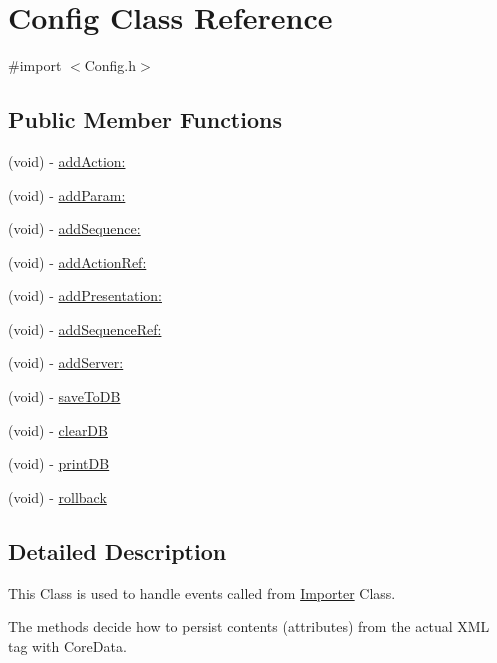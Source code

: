 \hypertarget{interface_config}{
\section{Config Class Reference}
\label{interface_config}
}


{\ttfamily \#import $<$Config.h$>$}

\subsection*{Public Member Functions}
\begin{DoxyCompactItemize}
\item 
(void) -\/ \hyperlink{interface_config_ad736974b0fa1ff6118003a824e2561b2}{addAction:}
\item 
(void) -\/ \hyperlink{interface_config_a47a88ff3de3b7101817eff6b8069ce4c}{addParam:}
\item 
(void) -\/ \hyperlink{interface_config_ae3094aa95cca8757e7d8c85db5645d86}{addSequence:}
\item 
(void) -\/ \hyperlink{interface_config_a6c5f7ab5dbf61e6ec0d0a11d3c6d0bcc}{addActionRef:}
\item 
(void) -\/ \hyperlink{interface_config_a2a5392539537865fdcd3263d79667dd5}{addPresentation:}
\item 
(void) -\/ \hyperlink{interface_config_ac912dcbfeb62c818e5723b1290067277}{addSequenceRef:}
\item 
(void) -\/ \hyperlink{interface_config_a58e5d989af8285ae713070e3a6a48d5b}{addServer:}
\item 
(void) -\/ \hyperlink{interface_config_aa2bd6231e65b16b31dc08692a2d9dc12}{saveToDB}
\item 
(void) -\/ \hyperlink{interface_config_a7830478092d7eb0d164d3ae07be48fe7}{clearDB}
\item 
(void) -\/ \hyperlink{interface_config_a7a0b49659ed69b7aabff2908f0208d6c}{printDB}
\item 
(void) -\/ \hyperlink{interface_config_a071de472f6ac976c658e4643f3fb3d0c}{rollback}
\end{DoxyCompactItemize}


\subsection{Detailed Description}
This Class is used to handle events called from \hyperlink{interface_importer}{Importer} Class.

The methods decide how to persist contents (attributes) from the actual XML tag with CoreData.

